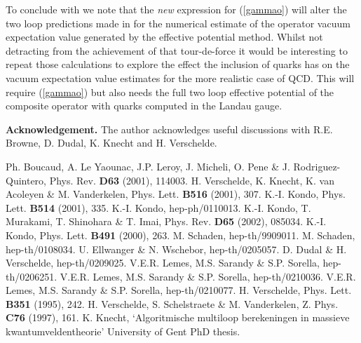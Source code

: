 \documentclass[a4paper,11pt]{article}
\begin{document}
To conclude with we note that the {\em new} expression for (\ref{gammao}) will
alter the two loop predictions made in \cite{2} for the numerical estimate of
the operator vacuum expectation value generated by the effective potential 
method. Whilst not detracting from the achievement of that tour-de-force it 
would be interesting to repeat those calculations to explore the effect the 
inclusion of quarks has on the vacuum expectation value estimates for the more
realistic case of QCD. This will require (\ref{gammao}) but also needs the full
two loop effective potential of the composite operator with quarks computed in 
the Landau gauge.  

\noindent
{\bf Acknowledgement.} The author acknowledges useful discussions with R.E.
Browne, D. Dudal, K. Knecht and H. Verschelde.  

\begin{thebibliography}{99} 
 Ph. Boucaud, A. Le Yaounac, J.P. Leroy, J. Micheli, O. Pene \&
J. Rodriguez-Quintero, Phys. Rev. {\bf D63} (2001), 114003. 
 H. Verschelde, K. Knecht, K. van Acoleyen \& M. Vanderkelen, 
Phys. Lett. {\bf B516} (2001), 307. 
 K.-I. Kondo, Phys. Lett. {\bf B514} (2001), 335.  
 K.-I. Kondo, hep-ph/0110013. 
 K.-I. Kondo, T. Murakami, T. Shinohara \& T. Imai, Phys. Rev. 
{\bf D65} (2002), 085034.  
 K.-I. Kondo, Phys. Lett. {\bf B491} (2000), 263.  
 M. Schaden, hep-th/9909011. 
 M. Schaden, hep-th/0108034. 
 U. Ellwanger \& N. Wschebor, hep-th/0205057. 
 D. Dudal \& H. Verschelde, hep-th/0209025.  
 V.E.R. Lemes, M.S. Sarandy \& S.P. Sorella, hep-th/0206251. 
 V.E.R. Lemes, M.S. Sarandy \& S.P. Sorella, hep-th/0210036. 
 V.E.R. Lemes, M.S. Sarandy \& S.P. Sorella, hep-th/0210077. 
 H. Verschelde, Phys. Lett. {\bf B351} (1995), 242. 
 H. Verschelde, S. Schelstraete \& M. Vanderkelen, Z. Phys. {\bf
C76} (1997), 161. 
 K. Knecht, `Algoritmische multiloop berekeningen in massieve
kwantumveldentheorie' University of Gent PhD thesis. 

\end{thebibliography}
\end{document}
